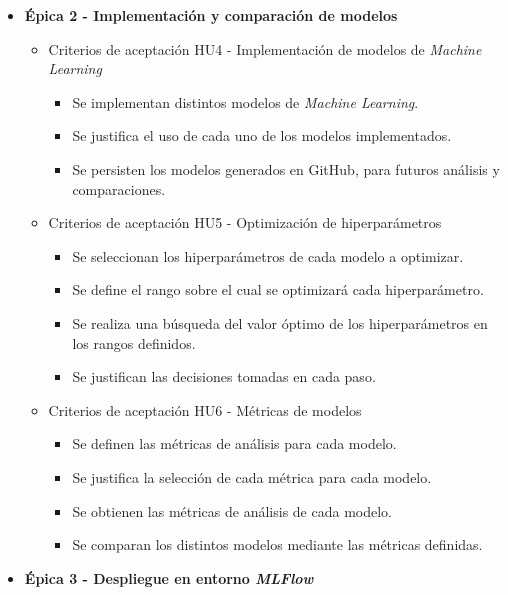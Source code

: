 \documentclass[
11pt, %
]{charter}
\begin{document}
\begin{itemize}
\begin{itemize}
\begin{itemize}
        \end{itemize}
    \end{itemize}
  \item \textbf{\'{E}pica 2 - Implementación y comparación de modelos}
    \begin{itemize}
      \item Criterios de aceptación HU4 - Implementación de modelos de \textit{Machine Learning}
        \begin{itemize}
            \item Se implementan distintos modelos de \textit{Machine Learning}.
            \item Se justifica el uso de cada uno de los modelos implementados.
            \item Se persisten los modelos generados en GitHub, para futuros análisis y comparaciones.
        \end{itemize}
      \item Criterios de aceptación HU5 - Optimización de hiperparámetros
        \begin{itemize}
            \item Se seleccionan los hiperparámetros de cada modelo a optimizar.
            \item Se define el rango sobre el cual se optimizará cada hiperparámetro.
            \item Se realiza una búsqueda del valor óptimo de los hiperparámetros en los rangos definidos.
            \item Se justifican las decisiones tomadas en cada paso.
        \end{itemize}
      \item Criterios de aceptación HU6 - Métricas de modelos
        \begin{itemize}
            \item Se definen las métricas de análisis para cada modelo.
            \item Se justifica la selección de cada métrica para cada modelo.
            \item Se obtienen las métricas de análisis de cada modelo.
            \item Se comparan los distintos modelos mediante las métricas definidas.
        \end{itemize}
    \end{itemize}
  \item \textbf{\'{E}pica 3 - Despliegue en entorno \textit{MLFlow}}
    \begin{itemize}

\end{itemize}
\end{itemize}
\end{document}
